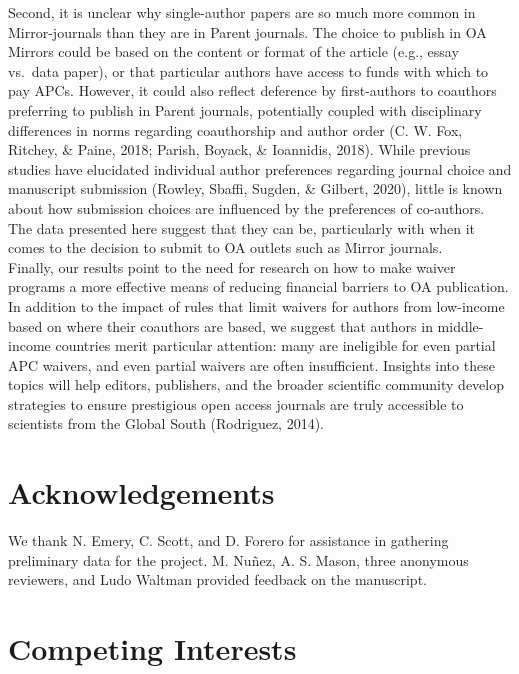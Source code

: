 \documentclass[
  english,
  man]{apa6}
\begin{document}
Second, it is unclear why single-author papers are so much more common in Mirror-journals than they are in Parent journals. The choice to publish in OA Mirrors could be based on the content or format of the article (e.g., essay vs.~data paper), or that particular authors have access to funds with which to pay APCs. However, it could also reflect deference by first-authors to coauthors preferring to publish in Parent journals, potentially coupled with disciplinary differences in norms regarding coauthorship and author order (C. W. Fox, Ritchey, \& Paine, 2018; Parish, Boyack, \& Ioannidis, 2018). While previous studies have elucidated individual author preferences regarding journal choice and manuscript submission (Rowley, Sbaffi, Sugden, \& Gilbert, 2020), little is known about how submission choices are influenced by the preferences of co-authors. The data presented here suggest that they can be, particularly with when it comes to the decision to submit to OA outlets such as Mirror journals.\\
Finally, our results point to the need for research on how to make waiver programs a more effective means of reducing financial barriers to OA publication. In addition to the impact of rules that limit waivers for authors from low-income based on where their coauthors are based, we suggest that authors in middle-income countries merit particular attention: many are ineligible for even partial APC waivers, and even partial waivers are often insufficient. Insights into these topics will help editors, publishers, and the broader scientific community develop strategies to ensure prestigious open access journals are truly accessible to scientists from the Global South (Rodriguez, 2014).

\hypertarget{acknowledgements}{%
\section{Acknowledgements}\label{acknowledgements}}

We thank N. Emery, C. Scott, and D. Forero for assistance in gathering preliminary data for the project. M. Nuñez, A. S. Mason, three anonymous reviewers, and Ludo Waltman provided feedback on the manuscript.

\hypertarget{competing-interests}{%
\section{Competing Interests}\label{competing-interests}}
\end{document}
